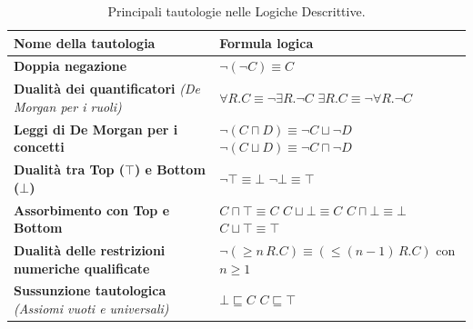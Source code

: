 \begin{table}[htbp]
    \centering
    \renewcommand{\arraystretch}{1.8}
    \begin{tabular}{|p{}|p{}|}
        \hline
        \textbf{Nome della tautologia} &
        \textbf{Formula logica} \\
        \hline

        \textbf{Doppia negazione}
        &
        $\neg(\neg C) \equiv C$
        \\
        \hline

        \textbf{Dualità dei quantificatori}
        \newline
        \textit{(De Morgan per i ruoli)}
        &
        $\forall R.C \equiv \neg\exists R.\neg C$
        \newline
        $\exists R.C \equiv \neg\forall R.\neg C$
        \\
        \hline

        \textbf{Leggi di De Morgan per i concetti}
        &
        $\neg(C \sqcap D) \equiv \neg C \sqcup \neg D$
        \newline
        $\neg(C \sqcup D) \equiv \neg C \sqcap \neg D$
        \\
        \hline

        \textbf{Dualità tra Top ($\top$) e Bottom ($\bot$)}
        &
        $\neg\top \equiv \bot$
        \newline
        $\neg\bot \equiv \top$
        \\
        \hline

        \textbf{Assorbimento con Top e Bottom}
        &
        $C \sqcap \top \equiv C$
        \newline
        $C \sqcup \bot \equiv C$
        \newline
        $C \sqcap \bot \equiv \bot$
        \newline
        $C \sqcup \top \equiv \top$
        \\
        \hline

        \textbf{Dualità delle restrizioni numeriche qualificate}
        &
        $\neg(\geq n\, R.C) \equiv
        (\leq (n-1)\, R.C)$
        \newline
        con $n \geq 1$
        \\
        \hline

        \textbf{Sussunzione tautologica}
        \newline
        \textit{(Assiomi vuoti e universali)}
        &
        $\bot \sqsubseteq C$
        \newline
        $C \sqsubseteq \top$
        \\
        \hline
    \end{tabular}
    \caption{Principali tautologie nelle Logiche Descrittive.}
    \label{tab:tautologie_dl}
\end{table}

